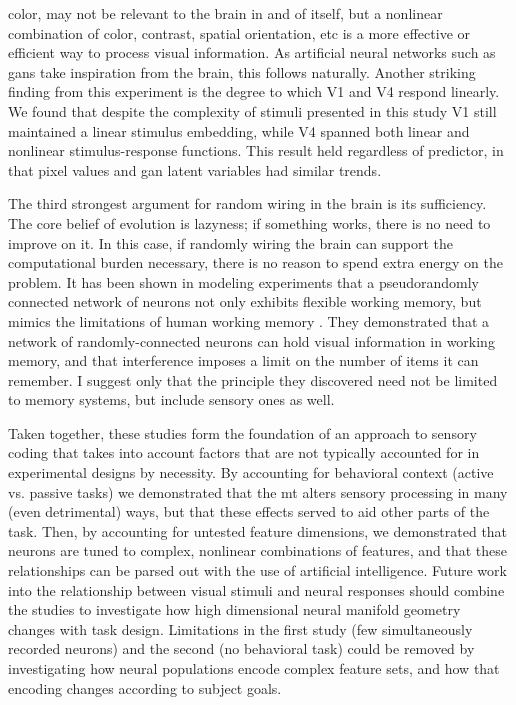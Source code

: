 color, may not be relevant to the brain in and of itself, but a nonlinear combination of color, contrast, spatial orientation, etc is a more effective or efficient way to process visual information. As artificial neural networks such as \gls{gan}s take inspiration from the brain, this follows naturally. Another striking finding from this experiment is the degree to which V1 and V4 respond linearly. We found that despite the complexity of stimuli presented in this study V1 still maintained a linear stimulus embedding, while V4 spanned both linear and nonlinear stimulus-response functions. This result held regardless of predictor, in that pixel values and \gls{gan} latent variables had similar trends. 

The third strongest argument for random wiring in the brain is its sufficiency. The core belief of evolution is lazyness; if something works, there is no need to improve on it. In this case, if randomly wiring the brain can support the computational burden necessary, there is no reason to spend extra energy on the problem. It has been shown in modeling experiments that a pseudorandomly connected network of neurons not only exhibits flexible working memory, but mimics the limitations of human working memory \parencite{Bouchacourt2019}. They demonstrated that a network of randomly-connected neurons can hold visual information in working memory, and that interference imposes a limit on the number of items it can remember. I suggest only that the principle they discovered need not be limited to memory systems, but include sensory ones as well. 

Taken together, these studies form the foundation of an approach to sensory coding that takes into account factors that are not typically accounted for in experimental designs by necessity. By accounting for behavioral context (active vs. passive tasks) we demonstrated that the \gls{mt} alters sensory processing in many (even detrimental) ways, but that these effects served to aid other parts of the task. Then, by accounting for untested feature dimensions, we demonstrated that neurons are tuned to complex, nonlinear combinations of features, and that these relationships can be parsed out with the use of artificial intelligence. Future work into the relationship between visual stimuli and neural responses should combine the studies to investigate how high dimensional neural manifold geometry changes with task design. Limitations in the first study (few simultaneously recorded neurons) and the second (no behavioral task) could be removed by investigating how neural populations encode complex feature sets, and how that encoding changes according to subject goals. 


